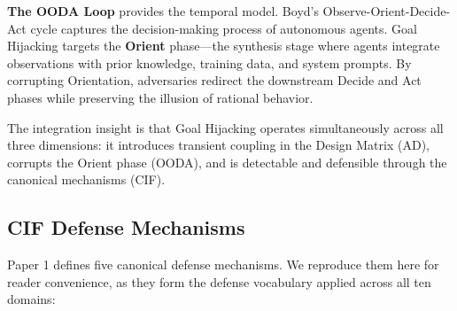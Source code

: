 \documentclass[
]{article}
\begin{document}
\textbf{The OODA Loop} provides the temporal model. Boyd's
Observe-Orient-Decide-Act cycle
\cite{boyd1987patterns, osinga2007science} captures the decision-making
process of autonomous agents. Goal Hijacking targets the \textbf{Orient}
phase---the synthesis stage where agents integrate observations with
prior knowledge, training data, and system prompts. By corrupting
Orientation, adversaries redirect the downstream Decide and Act phases
while preserving the illusion of rational behavior.

The integration insight is that Goal Hijacking operates simultaneously
across all three dimensions: it introduces transient coupling in the
Design Matrix (AD), corrupts the Orient phase (OODA), and is detectable
and defensible through the canonical mechanisms (CIF).

\subsection{CIF Defense Mechanisms}\label{cif-defense-mechanisms}

Paper 1 \cite{friedman2026cogsec1} defines five canonical defense
mechanisms. We reproduce them here for reader convenience, as they form
the defense vocabulary applied across all ten domains:
\end{document}
